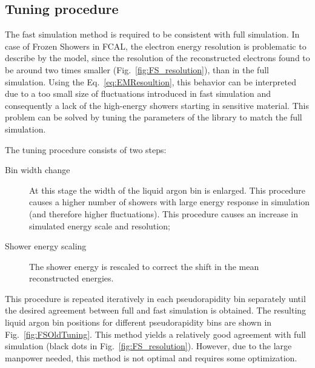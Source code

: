 \subsection{Tuning procedure}\label{sec:LibTuning}

The fast simulation method is required to be consistent with full simulation. In case of Frozen Showers in FCAL, the electron energy resolution is problematic to describe by the model, since the resolution of the reconstructed electrons found to be around two times smaller (Fig.~\ref{fig:FS_resolution}), than in the full simulation. Using the Eq.~\ref{eq:EMResoultion}, this behavior can be interpreted due to a too small size of fluctuations introduced in fast simulation and consequently a lack of the high-energy showers starting in sensitive material. This problem can be solved by tuning the parameters of the library to match the full simulation.

The tuning procedure consists of two steps:
\begin{description}
\item [Bin width change] At this stage the width of the liquid argon bin is enlarged. This procedure causes a higher number of showers with large energy response in simulation (and therefore higher fluctuations). This procedure causes an increase in simulated energy scale and resolution;
\item [Shower energy scaling] The shower energy is rescaled to correct the shift in the mean reconstructed energies.
\end{description}
This procedure is repeated iteratively in each pseudorapidity bin separately until the desired agreement between full and fast simulation is obtained. The resulting liquid argon bin positions for different pseudorapidity bins are shown in Fig.~\ref{fig:FSOldTuning}. This method yields a relatively good agreement with full simulation (black dots in Fig.~\ref{fig:FS_resolution}). However, due to the large manpower needed, this method is not optimal and requires some optimization.


\begin{figure}[!tbp]
\end{figure}


